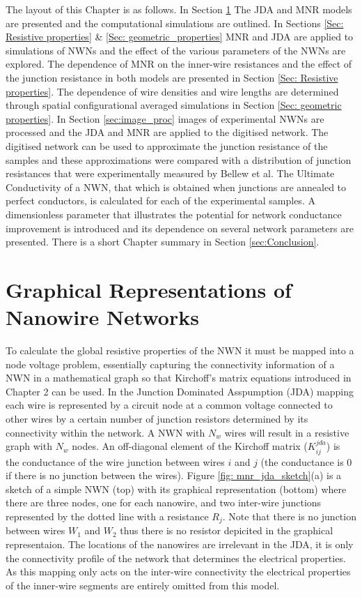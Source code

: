 The layout of this Chapter is as follows. In Section \ref{sec:Graphical Representations of NWNs} The JDA and MNR models are presented and the computational simulations are outlined. In Sections \ref{Sec: Resistive properties} \& \ref{Sec: geometric_properties} MNR and JDA are applied to simulations of NWNs and the effect of the various parameters of the NWNs are explored. The dependence of MNR on the inner-wire resistances and the effect of the junction resistance in both models are presented in Section \ref{Sec: Resistive properties}. The dependence of wire densities and wire lengths are determined through spatial configurational averaged simulations in Section \ref{Sec: geometric properties}. In Section \ref{sec:image_proc} images of experimental NWNs are processed and the JDA and MNR are applied to the digitised network. The digitised network can be used to approximate the junction resistance of the samples and these approximations were compared with a distribution of junction resistances that were experimentally measured by Bellew et al\cite{bellew2015}. The Ultimate Conductivity of a NWN, that which is obtained when junctions are annealed to perfect conductors, is calculated for each of the experimental samples. A dimensionless parameter that illustrates the potential for network conductance improvement is introduced and its dependence on several network parameters are presented. There is a short Chapter summary in Section \ref{sec:Conclusion}.

\section{Graphical Representations of Nanowire Networks}
\label{sec:Graphical Representations of NWNs}

To calculate the global resistive properties of the NWN it must be mapped into a node voltage problem, essentially capturing the connectivity information of a NWN in a mathematical graph so that Kirchoff's matrix equations introduced in Chapter 2 can be used. In the Junction Dominated Asspumption (JDA) mapping each wire is represented by a circuit node at a common voltage connected to other wires by a certain number of junction resistors determined by its connectivity within the network. A NWN with $N_w$ wires will result in a resistive graph with $N_w$ nodes. An off-diagonal element of the Kirchoff matrix ($K^{jda}_{ij}$) is the conductance of the wire junction between wires $i$ and $j$ (the conductance is 0 if there is no junction between the wires). Figure \ref{fig: mnr_jda_sketch}(a) is a sketch of a simple NWN (top) with its graphical representation (bottom) where there are three nodes, one for each nanowire, and two inter-wire junctions represented by the dotted line with a resistance $R_j$. Note that there is no junction between wires $W_1$ and $W_2$ thus there is no resistor depicited in the graphical representaion. The locations of the nanowires are irrelevant in the JDA, it is only the connectivity profile of the network that determines the electrical properties. As this mapping only acts on the inter-wire connectivity the electrical properties of the inner-wire segments are entirely omitted from this model.

